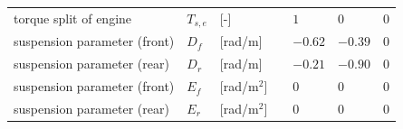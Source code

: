 \documentclass[11pt,a4paper]{article}
\renewcommand{\^}[1]{^{(#1)}}
\begin{document}
\begin{table}[h!tb]
{\begin{center}
\begin{tabular}{lllclll}
	torque split of engine & $T_{s,e}$ & [-] && $1$ & $0$ & $0$ \\
	suspension parameter (front) & $D_f$ & [rad/m] && $-0.62$ & $-0.39$ & $0$ \\
	suspension parameter (rear) & $D_r$ & [rad/m] && $-0.21$ & $-0.90$ & $0$ \\
	suspension parameter (front) & $E_f$ & [rad/m$^2$] && $0$ & $0$ & $0$ \\
	suspension parameter (rear) & $E_r$ & [rad/m$^2$] && $0$ & $0$ & $0$ \\
	\bottomrule %
\end{tabular}
\end{center}}
\end{table}

   

\end{document}
